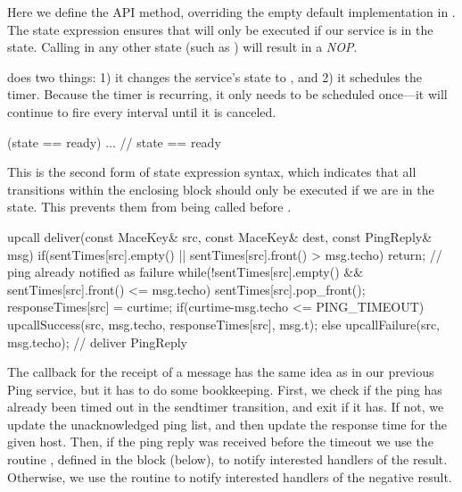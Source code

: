 Here we define the  API method, overriding the
empty default implementation in .  The state
expression  ensures that
 will only be executed if our service is in the
 state.  Calling  in any other
state (such as ) will result in a \emph{NOP}.

 does two things: 1) it changes the service's
state to , and 2) it schedules the timer.  Because
the timer is recurring, it only needs to be scheduled once---it will
continue to fire every  interval until it is
canceled.


\begin{programlisting}
  (state == ready) {
    ...
  } // state == ready
\end{programlisting}

This is the second form of state expression syntax, which indicates
that all transitions within the enclosing block should only be
executed if we are in the  state.  This prevents
them from being called before .


\begin{programlisting}
    upcall deliver(const MaceKey& src, const MaceKey& dest, const PingReply& msg) {
      if(sentTimes[src].empty() || sentTimes[src].front() > msg.techo) {
        return; // ping already notified as failure
      }
      while(!sentTimes[src].empty() && sentTimes[src].front() <= msg.techo) {
        sentTimes[src].pop_front();
      }
      responseTimes[src] = curtime;
      if(curtime-msg.techo <= PING_TIMEOUT) {
        upcallSuccess(src, msg.techo, responseTimes[src], msg.t);
      } else {
        upcallFailure(src, msg.techo);
      }
    } // deliver PingReply
\end{programlisting}

The  callback for the receipt of a 
message has the same idea as in our previous Ping service, but it has to do
some bookkeeping.  First, we check if the ping has already been timed out in
the sendtimer transition, and exit if it has.  If not, we update the
unacknowledged ping list, and then update the response time for the given host.
Then, if the ping reply was received before the timeout we use the routine
, defined in the  block (below),
to notify interested handlers of the result. Otherwise, we use the
 routine to notify interested handlers of the
negative result.

